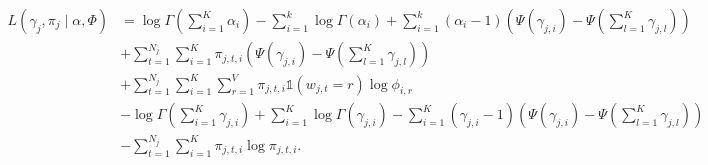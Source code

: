 \documentclass[11pt]{article}
\begin{document}
\begin{equation}
  \begin{split}
    L(\gamma_j, \pi_j \mid \alpha, \Phi)
    &=
    \log \Gamma\left(\sum_{i=1}^K \alpha_i\right)
    - \sum_{i=1}^k \log \Gamma(\alpha_i)
    + \sum_{i=1}^k (\alpha_i - 1)
    \left(\Psi(\gamma_{j,i}) - \Psi\left(\sum_{l=1}^K \gamma_{j,l}\right)\right)
    \\&+
    \sum_{t=1}^{N_j} \sum_{i=1}^K \pi_{j,t,i}
    \left(\Psi(\gamma_{j,i}) - \Psi\left(\sum_{l=1}^K \gamma_{j,l}\right)\right)
    \\&+
    \sum_{t=1}^{N_j} \sum_{i=1}^K \sum_{r=1}^V
    \pi_{j,t,i} \mathbb{1}(w_{j,t} = r) \log \phi_{i,r}
    \\&-
    \log \Gamma\left(\sum_{i=1}^K \gamma_{j,i}\right)
    + \sum_{i=1}^K \log \Gamma(\gamma_{j,i})
    - \sum_{i=1}^K (\gamma_{j,i} - 1)
    \left(\Psi(\gamma_{j,i}) - \Psi\left(\sum_{l=1}^K \gamma_{j,l}\right)\right)
    \\&-
    \sum_{t=1}^{N_j} \sum_{i=1}^K
    \pi_{j,t,i} \log \pi_{j,t,i}.
  \end{split}
\end{equation}
\end{document}
